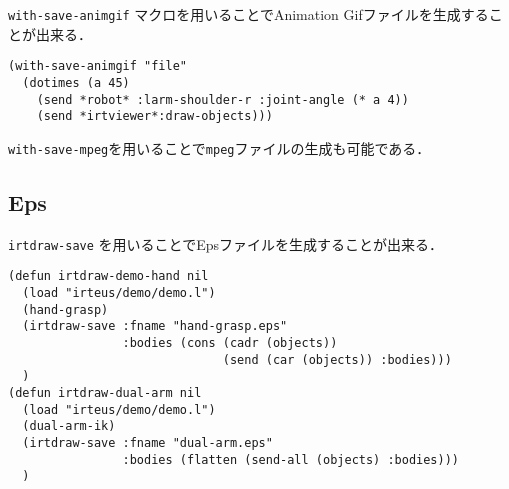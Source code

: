 \verb+with-save-animgif+ マクロを用いることでAnimation Gifファイルを生成することが出来る．


{\baselineskip=10pt
\begin{verbatim}
(with-save-animgif "file"
  (dotimes (a 45)
    (send *robot* :larm-shoulder-r :joint-angle (* a 4))
    (send *irtviewer*:draw-objects)))
\end{verbatim}
}

\verb+with-save-mpeg+を用いることで\verb+mpeg+ファイルの生成も可能である．

\subsection{Eps}

\verb+irtdraw-save+ を用いることでEpsファイルを生成することが出来る．

{\baselineskip=10pt
\begin{verbatim}
(defun irtdraw-demo-hand nil
  (load "irteus/demo/demo.l")
  (hand-grasp)
  (irtdraw-save :fname "hand-grasp.eps"
                :bodies (cons (cadr (objects))
                              (send (car (objects)) :bodies)))
  )
(defun irtdraw-dual-arm nil
  (load "irteus/demo/demo.l")
  (dual-arm-ik)
  (irtdraw-save :fname "dual-arm.eps"
                :bodies (flatten (send-all (objects) :bodies)))
  )
\end{verbatim}
}
